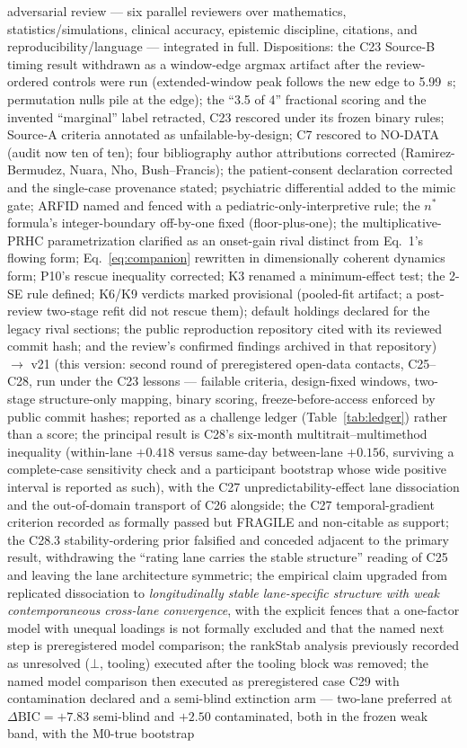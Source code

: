 \documentclass[9pt,twocolumn]{article}
\begin{document}
adversarial review --- six parallel reviewers over mathematics, statistics/simulations, clinical accuracy, epistemic discipline, citations, and reproducibility/language --- integrated in full. Dispositions: the C23 Source-B timing result withdrawn as a window-edge argmax artifact after the review-ordered controls were run (extended-window peak follows the new edge to 5.99~s; permutation nulls pile at the edge); the ``3.5 of 4'' fractional scoring and the invented ``marginal'' label retracted, C23 rescored under its frozen binary rules; Source-A criteria annotated as unfailable-by-design; C7 rescored to NO-DATA (audit now ten of ten); four bibliography author attributions corrected (Ramirez-Bermudez, Nuara, Nho, Bush--Francis); the patient-consent declaration corrected and the single-case provenance stated; psychiatric differential added to the mimic gate; ARFID named and fenced with a pediatric-only-interpretive rule; the $n^{*}$ formula's integer-boundary off-by-one fixed (floor-plus-one); the multiplicative-PRHC parametrization clarified as an onset-gain rival distinct from Eq.~1's flowing form; Eq.~\ref{eq:companion} rewritten in dimensionally coherent dynamics form; P10's rescue inequality corrected; K3 renamed a minimum-effect test; the 2-SE rule defined; K6/K9 verdicts marked provisional (pooled-fit artifact; a post-review two-stage refit did not rescue them); default holdings declared for the legacy rival sections; the public reproduction repository cited with its reviewed commit hash; and the review's confirmed findings archived in that repository) $\rightarrow$ v21 (this version: second round of preregistered open-data contacts, C25--C28, run under the C23 lessons --- failable criteria, design-fixed windows, two-stage structure-only mapping, binary scoring, freeze-before-access enforced by public commit hashes; reported as a challenge ledger (Table~\ref{tab:ledger}) rather than a score; the principal result is C28's six-month multitrait--multimethod inequality (within-lane $+0.418$ versus same-day between-lane $+0.156$, surviving a complete-case sensitivity check and a participant bootstrap whose wide positive interval is reported as such), with the C27 unpredictability-effect lane dissociation and the out-of-domain transport of C26 alongside; the C27 temporal-gradient criterion recorded as formally passed but FRAGILE and non-citable as support; the C28.3 stability-ordering prior falsified and conceded adjacent to the primary result, withdrawing the ``rating lane carries the stable structure'' reading of C25 and leaving the lane architecture symmetric; the empirical claim upgraded from replicated dissociation to \emph{longitudinally stable lane-specific structure with weak contemporaneous cross-lane convergence}, with the explicit fences that a one-factor model with unequal loadings is not formally excluded and that the named next step is preregistered model comparison; the rankStab analysis previously recorded as unresolved ($\bot$, tooling) executed after the tooling block was removed; the named model comparison then executed as preregistered case C29 with contamination declared and a semi-blind extinction arm --- two-lane preferred at $\Delta\mathrm{BIC}=+7.83$ semi-blind and $+2.50$ contaminated, both in the frozen weak band, with the M0-true bootstrap 
\end{document}
